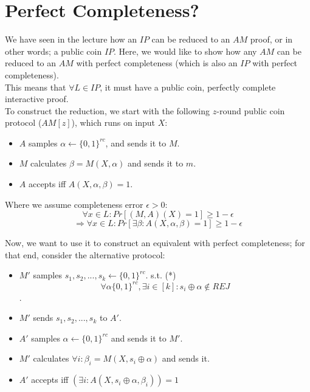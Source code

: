 \section*{Perfect Completeness?}
We have seen in the lecture how an $IP$ can be reduced to an $AM$ proof, or in other words; a public coin $IP$. Here, we would like to show how any $AM$ can be reduced to an $AM$ with perfect completeness (which is also an $IP$ with perfect completeness).\\
This means that $\forall L\in IP$, it must have a public coin, perfectly complete interactive proof.\\
To construct the reduction, we start with the following $z$-round public coin protocol ($AM[z]$), which runs on input $X$:
\begin{itemize}
    \item $A$ samples $\alpha\leftarrow \{0,1\}^{rc}$, and sends it to $M$.
    \item $M$ calculates $\beta=M(X,\alpha)$ and sends it to $m$.
    \item $A$ accepts iff $A(X,\alpha,\beta)=1$.
\end{itemize}
Where we assume completeness error $\epsilon>0$:
\[\forall x\in L:
Pr[(M,A)(X)=1]\geq 1-\epsilon\]
\[\Rightarrow \forall x\in L:
Pr[\exists \beta: A(X,\alpha,\beta)=1]\geq 1-\epsilon\]


Now, we want to use it to construct an equivalent with perfect completeness; for that end, consider the alternative protocol:
\begin{itemize}
    \item $M'$ samples $s_1,s_2,...,s_k\leftarrow \{0,1\}^{rc}$. s.t. (*)
    \[\forall \alpha \{0,1\}^{rc},\exists i\in [k]: s_i\oplus \alpha\notin REJ\].
    \item $M'$ sends $s_1,s_2,...,s_k$ to $A'$.
    \item $A'$ samples $\alpha \leftarrow \{0,1\}^{rc}$ and sends it to $M'$.
    \item $M'$ calculates $\forall i: \beta_i=M(X,s_i\oplus\alpha)$ and sends it.
    \item $A'$ accepts iff $\left(\exists i:A(X,s_i\oplus\alpha, \beta_i)\right)=1$
\end{itemize}

